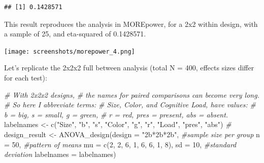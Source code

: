 \documentclass[
]{book}
\newenvironment{Shaded}{\begin{snugshade}}{\end{snugshade}}
\newcommand{\AttributeTok}[1]{\textcolor[rgb]{0.77,0.63,0.00}{#1}}
\newcommand{\CommentTok}[1]{\textcolor[rgb]{0.56,0.35,0.01}{\textit{#1}}}
\newcommand{\DecValTok}[1]{\textcolor[rgb]{0.00,0.00,0.81}{#1}}
\newcommand{\FunctionTok}[1]{\textcolor[rgb]{0.00,0.00,0.00}{#1}}
\newcommand{\NormalTok}[1]{#1}
\newcommand{\OtherTok}[1]{\textcolor[rgb]{0.56,0.35,0.01}{#1}}
\newcommand{\SpecialCharTok}[1]{\textcolor[rgb]{0.00,0.00,0.00}{#1}}
\newcommand{\StringTok}[1]{\textcolor[rgb]{0.31,0.60,0.02}{#1}}
\begin{document}
\begin{Shaded}
\end{Shaded}

\begin{verbatim}
## [1] 0.1428571
\end{verbatim}

This result reproduces the analysis in MOREpower, for a 2x2 within design, with a sample of 25, and eta-squared of 0.1428571.

\texttt{[image: screenshots/morepower\_4.png]}

Let's replicate the 2x2x2 full between analysis (total N = 400, effects sizes differ for each test):

\begin{Shaded}
\begin{Highlighting}[]
\CommentTok{\# With 2x2x2 designs,}
\CommentTok{\# the names for paired comparisons can become very long.}
\CommentTok{\# So here I abbreviate terms:}
\CommentTok{\# Size, Color, and Cognitive Load, have values:}
\CommentTok{\# b = big, s = small, g = green,}
\CommentTok{\# r = red, pres = present, abs = absent.}
\NormalTok{labelnames }\OtherTok{\textless{}{-}} \FunctionTok{c}\NormalTok{(}\StringTok{"Size"}\NormalTok{, }\StringTok{"b"}\NormalTok{, }\StringTok{"s"}\NormalTok{, }\StringTok{"Color"}\NormalTok{, }\StringTok{"g"}\NormalTok{, }\StringTok{"r"}\NormalTok{,}
                \StringTok{"Load"}\NormalTok{, }\StringTok{"pres"}\NormalTok{, }\StringTok{"abs"}\NormalTok{) }\CommentTok{\#}
\NormalTok{design\_result }\OtherTok{\textless{}{-}} \FunctionTok{ANOVA\_design}\NormalTok{(}\AttributeTok{design =} \StringTok{"2b*2b*2b"}\NormalTok{,}
                              \CommentTok{\#sample size per group}
                              \AttributeTok{n =} \DecValTok{50}\NormalTok{,}
                              \CommentTok{\#pattern of means}
                              \AttributeTok{mu =} \FunctionTok{c}\NormalTok{(}\DecValTok{2}\NormalTok{, }\DecValTok{2}\NormalTok{, }\DecValTok{6}\NormalTok{, }\DecValTok{1}\NormalTok{, }\DecValTok{6}\NormalTok{, }\DecValTok{6}\NormalTok{, }\DecValTok{1}\NormalTok{, }\DecValTok{8}\NormalTok{),}
                              \AttributeTok{sd =} \DecValTok{10}\NormalTok{, }\CommentTok{\#standard deviation}
                              \AttributeTok{labelnames =}\NormalTok{ labelnames)}
\end{Highlighting}
\end{Shaded}
\end{document}

